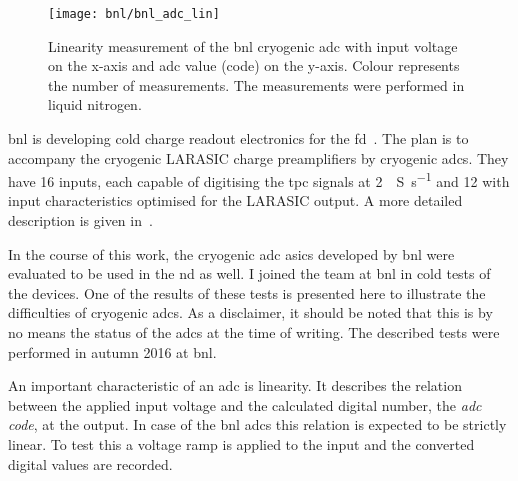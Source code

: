 \begin{figure}[tbp]
	\centering
	\texttt{[image: bnl/bnl\_adc\_lin]}
	\caption[Linearity measurement of  cryogenic  ]{%
		Linearity measurement of the \acrshort{bnl} cryogenic \acrshort{adc}  with input voltage on the x-axis and \acrshort{adc} value (code) on the y-axis.
		Colour represents the number of measurements.
		The measurements were performed in liquid nitrogen.
	}
	\label{fig:bnl_adc_lin}
\end{figure}

\gls{bnl} is developing cold charge readout electronics for the \dune{} \gls{fd}~\cite{protodune-sp}.
The plan is to accompany the cryogenic LARASIC charge preamplifiers by cryogenic \glspl{adc}.
They have \num{16} inputs, each capable of digitising the \gls{tpc} signals at \SI{2}{\mega{}S\per\second} and \SI{12}{\bit} with input characteristics optimised for the LARASIC output.
A more detailed description is given in~\cite{bnl_adc}.

In the course of this work, the cryogenic \gls{adc} \glspl{asic} developed by \gls{bnl} were evaluated to be used in the \gls{nd} as well.
I joined the team at \gls{bnl} in cold tests of the devices.
One of the results of these tests is presented here to illustrate the difficulties of cryogenic \glspl{adc}.
As a disclaimer, it should be noted that this is by no means the status of the \glspl{adc} at the time of writing.
The described tests were performed in autumn 2016 at \gls{bnl}.

An important characteristic of an \gls{adc} is linearity.
It describes the relation between the applied input voltage and the calculated digital number, the \emph{\gls{adc} code}, at the output.
In case of the \gls{bnl} \glspl{adc} this relation is expected to be strictly linear.
To test this a voltage ramp is applied to the input and the converted digital values are recorded.

